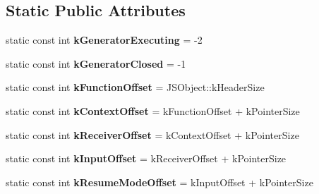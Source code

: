 \subsection*{Static Public Attributes}
\begin{DoxyCompactItemize}
\item 
static const int {\bfseries k\+Generator\+Executing} = -\/2\hypertarget{classv8_1_1internal_1_1_j_s_generator_object_a3b515123f771dc8d61065ded67f7f1f9}{}\label{classv8_1_1internal_1_1_j_s_generator_object_a3b515123f771dc8d61065ded67f7f1f9}

\item 
static const int {\bfseries k\+Generator\+Closed} = -\/1\hypertarget{classv8_1_1internal_1_1_j_s_generator_object_a305bc269946a338f1232f4268392fa05}{}\label{classv8_1_1internal_1_1_j_s_generator_object_a305bc269946a338f1232f4268392fa05}

\item 
static const int {\bfseries k\+Function\+Offset} = J\+S\+Object\+::k\+Header\+Size\hypertarget{classv8_1_1internal_1_1_j_s_generator_object_a2a98d0be0311407edc54535904231140}{}\label{classv8_1_1internal_1_1_j_s_generator_object_a2a98d0be0311407edc54535904231140}

\item 
static const int {\bfseries k\+Context\+Offset} = k\+Function\+Offset + k\+Pointer\+Size\hypertarget{classv8_1_1internal_1_1_j_s_generator_object_ac019c55d4dbe5d8b914bb4d1741ca3a6}{}\label{classv8_1_1internal_1_1_j_s_generator_object_ac019c55d4dbe5d8b914bb4d1741ca3a6}

\item 
static const int {\bfseries k\+Receiver\+Offset} = k\+Context\+Offset + k\+Pointer\+Size\hypertarget{classv8_1_1internal_1_1_j_s_generator_object_abb28d5ab4f831bba6511c375521df70b}{}\label{classv8_1_1internal_1_1_j_s_generator_object_abb28d5ab4f831bba6511c375521df70b}

\item 
static const int {\bfseries k\+Input\+Offset} = k\+Receiver\+Offset + k\+Pointer\+Size\hypertarget{classv8_1_1internal_1_1_j_s_generator_object_a79dcfa8cf2b7f55041bf3a174ad1f3fe}{}\label{classv8_1_1internal_1_1_j_s_generator_object_a79dcfa8cf2b7f55041bf3a174ad1f3fe}

\item 
static const int {\bfseries k\+Resume\+Mode\+Offset} = k\+Input\+Offset + k\+Pointer\+Size\hypertarget{classv8_1_1internal_1_1_j_s_generator_object_abc8481eb89e769630567d6955f3cfe03}{}\label{classv8_1_1internal_1_1_j_s_generator_object_abc8481eb89e769630567d6955f3cfe03}


\end{DoxyCompactItemize}
